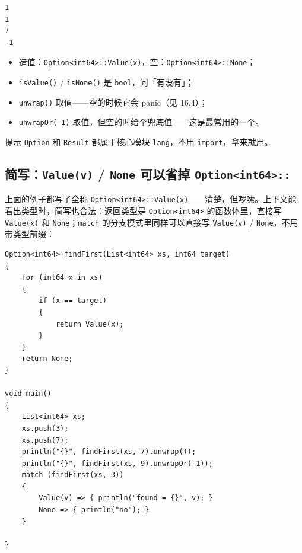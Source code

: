 \par
\medskip
\begin{lstlisting}[style=out]
1
1
7
-1
\end{lstlisting}
\par
\medskip

\begin{itemize}

\item 造值：\texttt{Option<\allowbreak{}int64>\allowbreak{}:\allowbreak{}:\allowbreak{}Value(\allowbreak{}x)\allowbreak{}}，空：\texttt{Option<\allowbreak{}int64>\allowbreak{}:\allowbreak{}:\allowbreak{}None}；

\item \texttt{is\allowbreak{}Value(\allowbreak{})\allowbreak{}} / \texttt{is\allowbreak{}None(\allowbreak{})\allowbreak{}} 是 \texttt{bool}，问「有没有」；

\item \texttt{unwrap(\allowbreak{})\allowbreak{}} 取值——空的时候它会 panic（见 16.4）；

\item \texttt{unwrap\allowbreak{}Or(\allowbreak{}-1)\allowbreak{}} 取值，但空的时给个兜底值——这是最常用的一个。

\end{itemize}

\begin{tip}{提示}
\texttt{Option} 和 \texttt{Result} 都属于核心模块 \texttt{lang}，不用 \texttt{import}，拿来就用。
\end{tip}

\subsection*{简写：\texttt{Value(\allowbreak{}v)\allowbreak{}} / \texttt{None} 可以省掉 \texttt{Option<\allowbreak{}int64>\allowbreak{}:\allowbreak{}:\allowbreak{}}}

上面的例子都写了全称 \texttt{Option<\allowbreak{}int64>\allowbreak{}:\allowbreak{}:\allowbreak{}Value(\allowbreak{}x)\allowbreak{}}——清楚，但啰嗦。上下文能看出类型时，简写也合法：返回类型是 \texttt{Option<\allowbreak{}int64>\allowbreak{}} 的函数体里，直接写 \texttt{Value(\allowbreak{}x)\allowbreak{}} 和 \texttt{None}；\texttt{match} 的分支模式里同样可以直接写 \texttt{Value(\allowbreak{}v)\allowbreak{}} / \texttt{None}，不用带类型前缀：

\par
\medskip
\begin{lstlisting}[style=chali]
Option<int64> findFirst(List<int64> xs, int64 target)
{
    for (int64 x in xs)
    {
        if (x == target)
        {
            return Value(x);
        }
    }
    return None;
}

void main()
{
    List<int64> xs;
    xs.push(3);
    xs.push(7);
    println("{}", findFirst(xs, 7).unwrap());
    println("{}", findFirst(xs, 9).unwrapOr(-1));
    match (findFirst(xs, 3))
    {
        Value(v) => { println("found = {}", v); }
        None => { println("no"); }
    }

}
\end{lstlisting}
\par
\medskip

